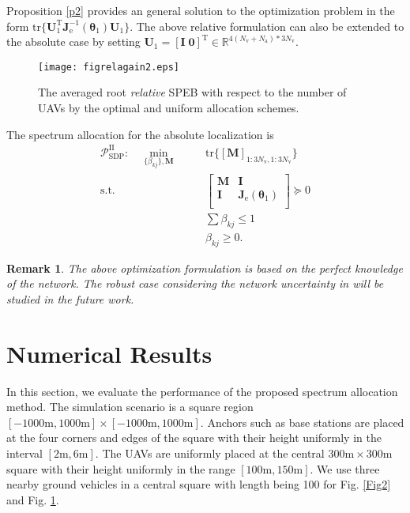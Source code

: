 \documentclass{IEEEtran}
\newtheorem{remark}{Remark}
\begin{document}
Proposition \ref{p2} provides an general solution to the optimization problem in the form $\text{tr}\{\mathbf{U}_1^{\text{T}}\mathbf{J}_{\text{e}}^{-1}(\boldsymbol{\theta}_1)\mathbf{U}_1\}$. The above relative formulation can also be extended to the absolute case by setting $\mathbf{U}_1=[\mathbf{I}\;\mathbf{0}]^{\text{T}}\in \mathbb{R}^{4(N_{\text{v}}+N_{\text{a}})*3N_{\text{v}}}$.
\begin{figure}[t]
    \centering
    \texttt{[image: figrelagain2.eps]}
    \caption{The averaged root \emph{relative} SPEB with respect to the number of UAVs by the optimal and uniform allocation schemes.}\label{Fig3}
\end{figure}
The spectrum allocation for the absolute localization is
\begin{eqnarray}\label{27}
\mathscr{P}_{\text{SDP}}^{\text{II}}: \quad \min_{\{\beta_{kj}\},\mathbf{M}} \quad &&\text{tr}\{[\mathbf{M}]_{1:3N_{\text{v}},1:3N_{\text{v}}}\} \nonumber\\
\text{s.t.} \quad &&\begin{bmatrix}
  \mathbf{M}&\mathbf{I}\\
  \mathbf{I}&\mathbf{J}_{\text{e}}(\boldsymbol{\theta}_1) \\
\end{bmatrix}\succeq 0 \label{24}\\
&&\sum \beta_{kj}\leq 1 \nonumber\\
&&\beta_{kj}\geq 0.\nonumber
\end{eqnarray}

\begin{remark}
The above optimization formulation is based on the perfect knowledge of the network. The robust case considering the network uncertainty in \cite{DaiSheWin:J15} will be studied in the future work.
\end{remark}

\section{Numerical Results}
In this section, we evaluate the performance of the proposed spectrum allocation method. The simulation scenario is a square region $[-1000\text{m},1000\text{m}]\times [-1000\text{m},1000\text{m}]$. Anchors such as base stations are placed at the four corners and edges of the square with their height uniformly in the interval $[2\text{m}, 6\text{m}]$. The UAVs are uniformly placed at the central $300\text{m}\times300\text{m}$ square with their height uniformly in the range $[100\text{m}, 150\text{m}]$.
We use three nearby ground vehicles in a central square with length being 100 for Fig. \ref{Fig2} and Fig. \ref{Fig3}.
\end{document}
